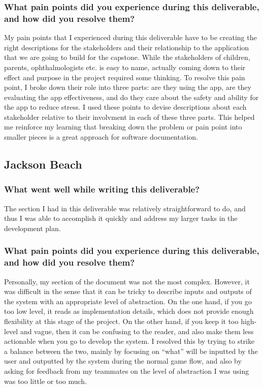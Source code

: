 \documentclass{article}
\begin{document}
\subsubsection*{What pain points did you experience during this deliverable, and how did you resolve them?}

My pain points that I experienced during this deliverable have to be creating 
the right descriptions for the stakeholders and their relationship to the 
application that we are going to build for the capstone. While the stakeholders 
of children, parents, ophthalmologists etc. is easy to name, actually coming 
down to their effect and purpose in the project required some thinking. To 
resolve this pain point, I broke down their role into three parts: are they 
using the app, are they evaluating the app effectiveness, and do they care about 
the safety and ability for the app to reduce stress. I used these points to 
devise descriptions about each stakeholder relative to their involvment in each 
of these three parts. This helped me reinforce my learning that breaking down 
the problem or pain point into smaller pieces is a great approach for software 
documentation.

\subsection*{Jackson Beach}

\subsubsection*{What went well while writing this deliverable?}
The section I had in this deliverable was relatively straightforward to do, and thus I was able to accomplish it quickly and
address my larger tasks in the development plan.

\subsubsection*{What pain points did you experience during this deliverable, and how did you resolve them?}
Personally, my section of the document was not the most complex. However, it was difficult in the sense that it
can be tricky to describe inputs and outputs of the system with an appropriate level of abstraction. On the one hand,
if you go too low level, it reads as implementation details, which does not provide enough flexibility at this stage of
the project. On the other hand, if you keep it too high-level and vague, then it can be confusing to the reader, and also
make them less actionable when you go to develop the system. I resolved this by trying to strike a balance between the two,
mainly by focusing on ``what'' will be inputted by the user and outputted by the system during the normal game flow, and also
by asking for feedback from my teammates on the level of abstraction I was using was too little or too much.
\end{document}
